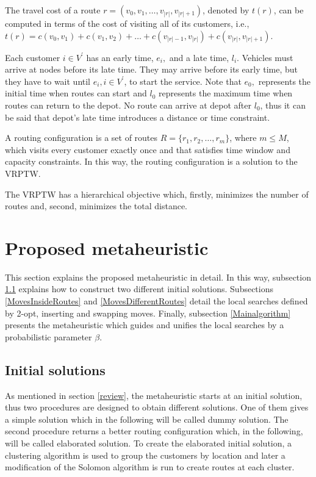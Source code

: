 The travel cost of a route $r = (v_{0},v_{1},\dots,v_{|r|},v_{|r|+1})$, denoted by $t(r)$, can be computed in terms of the cost of visiting all of its customers, i.e., $t(r) = c(v_{0},v_{1})+ c(v_{1},v_{2})+ \dots + c(v_{|r|-1},v_{|r|}) + c(v_{|r|},v_{|r|+1})$.

Each customer $ i \in V^{'}$ has an early time, $e_{i},$ and a late time, $l_{i} $. Vehicles must arrive at nodes before its late time. They may arrive before its early time, but they have to wait until $e_{i}, i \in V^{'}$, to start the service. Note that $e_{0},$ represents the initial time when routes can start and $l_{0}$ represents the maximum time when routes can return to the depot. No route can arrive at depot after $l_{0}$, thus it can be said that depot's late time introduces a distance or time constraint. %


A routing configuration is a set of routes $R=\{r_{1},r_{2},\dots,r_{m} \}$, where $m \leq M$, which visits every customer exactly once and that satisfies time window and capacity constraints. In this way, the routing configuration is a solution to the VRPTW. 

The VRPTW has a hierarchical objective which, firstly, minimizes the number of routes and, second, minimizes the total distance.

\section{Proposed metaheuristic}\label{proposed_metaheuristic}

This section explains the proposed metaheuristic in detail. In this way, subsection \ref{initialsol} explains how to construct two different initial solutions. Subsections \ref{MovesInsideRoutes} and \ref{MovesDifferentRoutes} detail the local searches defined by 2-opt, inserting and swapping moves. Finally, subsection \ref{Mainalgorithm} presents the metaheuristic which guides and unifies the local searches by a probabilistic parameter $\beta$.

\subsection{Initial solutions}\label{initialsol}

As mentioned in section \ref{review}, the metaheuristic starts at an initial solution, thus two procedures are designed to obtain different solutions. One of them gives a simple solution which in the following will be called dummy solution. The second procedure returns a better routing configuration which, in the following, will be called elaborated solution. To create the elaborated initial solution, a clustering algorithm is used to group the customers by location and later a modification of the Solomon algorithm is run to create routes at each cluster.

